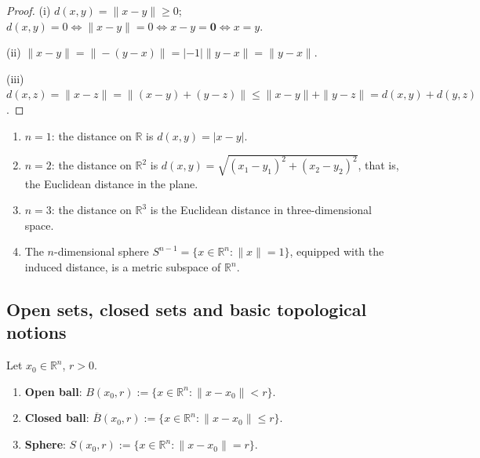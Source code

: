 \begin{proof}
(i) $d(x, y) = \|x - y\| \ge 0$; $d(x, y) = 0 \iff \|x - y\| = 0 \iff x - y = \mathbf{0} \iff x = y$.

(ii) $\|x - y\| = \|-(y - x)\| = |-1| \|y - x\| = \|y - x\|$.

(iii) $d(x, z) = \|x - z\| = \|(x - y) + (y - z)\| \le \|x - y\| + \|y - z\| = d(x, y) + d(y, z)$.
\end{proof}

\begin{example}\label{ex:euclidean_examples}
\begin{enumerate}[label=(\roman*)]
    \item $n = 1$: the distance on $\mathbb{R}$ is $d(x, y) = |x - y|$.
    \item $n = 2$: the distance on $\mathbb{R}^2$ is $d(x, y) = \sqrt{(x_1 - y_1)^2 + (x_2 - y_2)^2}$, that is, the Euclidean distance in the plane.
    \item $n = 3$: the distance on $\mathbb{R}^3$ is the Euclidean distance in three-dimensional space.
    \item The $n$-dimensional sphere $S^{n-1} = \{x \in \mathbb{R}^n : \|x\| = 1\}$, equipped with the induced distance, is a metric subspace of $\mathbb{R}^n$.
\end{enumerate}
\end{example}

\subsection{Open sets, closed sets and basic topological notions}

\begin{definition}\label{def:open_ball}
Let $x_0 \in \mathbb{R}^n$, $r > 0$.
\begin{enumerate}[label=(\roman*)]
    \item \textbf{Open ball}: $B(x_0, r) := \{x \in \mathbb{R}^n : \|x - x_0\| < r\}$.
    \item \textbf{Closed ball}: $\overline{B}(x_0, r) := \{x \in \mathbb{R}^n : \|x - x_0\| \le r\}$.
    \item \textbf{Sphere}: $S(x_0, r) := \{x \in \mathbb{R}^n : \|x - x_0\| = r\}$.
\end{enumerate}
\end{definition}

